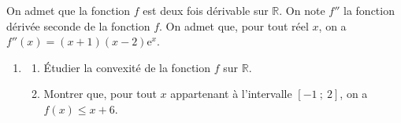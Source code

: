 \documentclass[10pt]{article}
\begin{document}
On admet que la fonction $f$ est deux fois dérivable sur $\mathbb{R}$. On note $f''$ la fonction dérivée seconde de la fonction $f$. On admet que, pour tout réel $x$, on a $f''(x) = (x + 1)(x - 2) \mathrm{e}^{x}$.

\begin{enumerate}[resume]
\item 
	\begin{enumerate}
		\item Étudier la convexité de la fonction $f$ sur $\mathbb{R}$.
		\item Montrer que, pour tout $x$ appartenant à l'intervalle $[-1~;~2]$, on a $f(x) \leqslant x + 6$.	
	\end{enumerate}
\end{enumerate}

\bigskip
\end{document}
